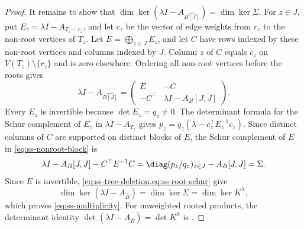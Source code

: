 \begin{proof}
It remains to show that
$\dim\ker(\lambda I-A_{\widehat{B[J]}})=\dim\ker \Sigma$.
For $z\in J$, put $E_z=\lambda I-A_{T_z-r_z}$, and let
$c_z$ be the vector of edge weights from $r_z$ to the non-root vertices
of $T_z$.
Let $E=\bigoplus_{z\in J}E_z$, and let $C$ have rows indexed by these
non-root vertices and columns indexed by $J$.
Column $z$ of $C$ equals $c_z$ on $V(T_z)\setminus\{r_z\}$ and is
zero elsewhere.
Ordering all non-root vertices before the roots gives
\begin{equation}\label{eq:ss-nonroot-block}
 \lambda I-A_{\widehat{B[J]}}=
 \begin{pmatrix}E&-C\\-C^{\top}&\lambda I-A_{B}[J,J]\end{pmatrix}.
\end{equation}
Every $E_z$ is invertible because $\det E_z=q_z\ne0$.
The determinant formula for the Schur complement of $E_z$ in
$\lambda I-A_{T_z}$ gives
$p_z=q_z(\lambda-c_z^{\top}E_z^{-1}c_z)$.
Since distinct columns of $C$ are supported on distinct blocks of $E$,
the Schur complement of $E$ in \cref{eq:ss-nonroot-block} is
\begin{equation}\label{eq:ss-root-schur}
 \lambda I-A_{B}[J,J]-C^{\top}E^{-1}C
 =\diag(p_z/q_z)_{z\in J}-A_{B}[J,J]=\Sigma.
\end{equation}
Since $E$ is invertible, \cref{eq:ss-tree-deletion,eq:ss-root-schur} give
\begin{equation}\label{eq:ss-kernel-reduction}
 \dim\ker(\lambda I-A_{\widehat B})
 =\dim\ker \Sigma
 =\dim\ker K^\lambda,
\end{equation}
which proves \cref{eq:ss-multiplicity}.
For unweighted rooted products, the determinant identity
$\det(\lambda I-A_{\widehat B})=\det K^\lambda$
is \cite[Theorem~2.1]{GodsilMcKay1978}.
\end{proof}


